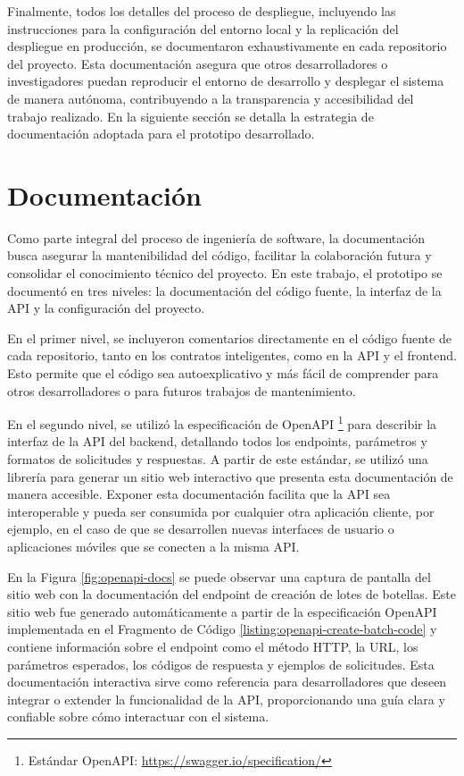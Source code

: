 Finalmente, todos los detalles del proceso de despliegue, incluyendo las instrucciones para la configuración del entorno local y la replicación del despliegue en producción, se documentaron exhaustivamente en cada repositorio del proyecto. Esta documentación asegura que otros desarrolladores o investigadores puedan reproducir el entorno de desarrollo y desplegar el sistema de manera autónoma, contribuyendo a la transparencia y accesibilidad del trabajo realizado. En la siguiente sección se detalla la estrategia de documentación adoptada para el prototipo desarrollado.

\section{Documentación}
\label{sec:documentation}

Como parte integral del proceso de ingeniería de software, la documentación busca asegurar la mantenibilidad del código, facilitar la colaboración futura y consolidar el conocimiento técnico del proyecto. En este trabajo, el prototipo se documentó en tres niveles: la documentación del código fuente, la interfaz de la API y la configuración del proyecto.

En el primer nivel, se incluyeron comentarios directamente en el código fuente de cada repositorio, tanto en los contratos inteligentes, como en la API y el frontend. Esto permite que el código sea autoexplicativo y más fácil de comprender para otros desarrolladores o para futuros trabajos de mantenimiento. 

En el segundo nivel, se utilizó la especificación de OpenAPI \footnote{Estándar OpenAPI: \url{https://swagger.io/specification/}} para describir la interfaz de la API del backend, detallando todos los endpoints, parámetros y formatos de solicitudes y respuestas. A partir de este estándar, se utilizó una librería para generar un sitio web interactivo que presenta esta documentación de manera accesible. Exponer esta documentación facilita que la API sea interoperable y pueda ser consumida por cualquier otra aplicación cliente, por ejemplo, en el caso de que se desarrollen nuevas interfaces de usuario o aplicaciones móviles que se conecten a la misma API. 

En la Figura \ref{fig:openapi-docs} se puede observar una captura de pantalla del sitio web con la documentación del endpoint de creación de lotes de botellas. Este sitio web fue generado automáticamente a partir de la especificación OpenAPI implementada en el Fragmento de Código \ref{listing:openapi-create-batch-code} y contiene información sobre el endpoint como el método HTTP, la URL, los parámetros esperados, los códigos de respuesta y ejemplos de solicitudes. Esta documentación interactiva sirve como referencia para desarrolladores que deseen integrar o extender la funcionalidad de la API, proporcionando una guía clara y confiable sobre cómo interactuar con el sistema.

